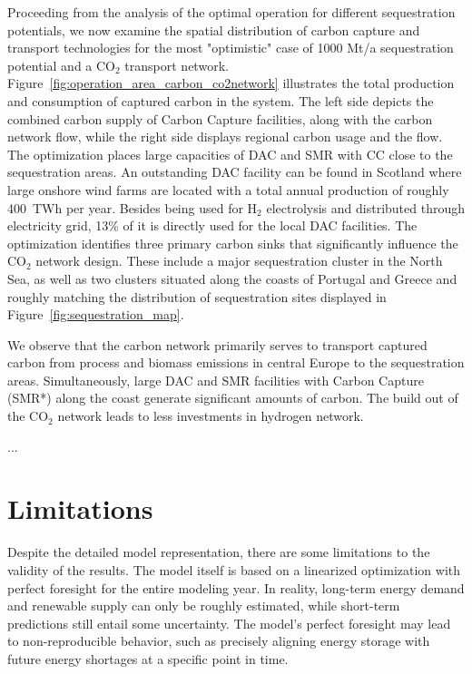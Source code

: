 \documentclass[conference]{IEEEtran}
\newcommand{\carbon}{CO$_2$ }
\begin{document}
Proceeding from the analysis of the optimal operation for different sequestration potentials, we now examine the spatial distribution of carbon capture and transport technologies for the most "optimistic" case of 1000 Mt/a sequestration potential and a \carbon transport network.
Figure~\ref{fig:operation_area_carbon_co2network} illustrates the total production and consumption of captured carbon in the system. The left side depicts the combined carbon supply of Carbon Capture facilities, along with the carbon network flow, while the right side displays regional carbon usage and the flow. The optimization places large capacities of DAC and SMR with CC close to the sequestration areas. An outstanding DAC facility can be found in Scotland where large onshore wind farms are located with a total annual production of roughly 400~TWh per year. Besides being used for H$_2$ electrolysis and distributed through electricity grid, 13\% of it is directly used for the  local DAC facilities. The optimization identifies three primary carbon sinks that significantly influence the \carbon network design. These include a major sequestration cluster in the North Sea, as well as two clusters situated along the coasts of Portugal and Greece and roughly matching the distribution of sequestration sites displayed in Figure~\ref{fig:sequestration_map}.

We observe that the carbon network primarily serves to transport captured carbon from process and biomass emissions in central Europe to the sequestration areas. Simultaneously, large DAC and SMR facilities with Carbon Capture (SMR*) along the coast generate significant amounts of carbon. The build out of the \carbon network leads to less investments in hydrogen network.

...


\section{Limitations}
\label{sec:limitations}

Despite the detailed model representation, there are some limitations to the validity of the results. The model itself is based on a linearized optimization with perfect foresight for the entire modeling year. In reality, long-term energy demand and renewable supply can only be roughly estimated, while short-term predictions still entail some uncertainty. The model's perfect foresight may lead to non-reproducible behavior, such as precisely aligning energy storage with future energy shortages at a specific point in time.
\end{document}
